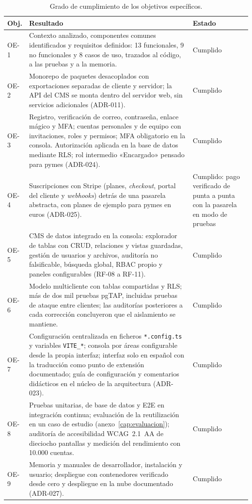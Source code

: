 \begin{table}[htbp]
  \centering
  \footnotesize
  \caption{Grado de cumplimiento de los objetivos específicos.}
  \label{tab:concl-objetivos}
  \begin{tabularx}{\textwidth}{@{}lX>{\raggedright\arraybackslash}p{2cm}@{}}
    \toprule
    \textbf{Obj.} & \textbf{Resultado} & \textbf{Estado} \\
    \midrule
    OE-1 & Contexto analizado, componentes comunes identificados y requisitos definidos: 13 funcionales, 9 no funcionales y 8 casos de uso, trazados al código, a las pruebas y a la memoria. & Cumplido \\
    OE-2 & Monorepo de paquetes desacoplados con exportaciones separadas de cliente y servidor; la API del CMS se monta dentro del servidor web, sin servicios adicionales (ADR-011). & Cumplido \\
    OE-3 & Registro, verificación de correo, contraseña, enlace mágico y MFA; cuentas personales y de equipo con invitaciones, roles y permisos; MFA obligatorio en la consola. Autorización aplicada en la base de datos mediante RLS; rol intermedio «Encargado» pensado para pymes (ADR-024). & Cumplido \\
    OE-4 & Suscripciones con Stripe (planes, \textit{checkout}, portal del cliente y \textit{webhooks}) detrás de una pasarela abstracta, con planes de ejemplo para pymes en euros (ADR-025). & Cumplido: pago verificado de punta a punta con la pasarela en modo de pruebas \\
    OE-5 & CMS de datos integrado en la consola: explorador de tablas con CRUD, relaciones y vistas guardadas, gestión de usuarios y archivos, auditoría no falsificable, búsqueda global, RBAC propio y paneles configurables (RF-08 a RF-11). & Cumplido \\
    OE-6 & Modelo multicliente con tablas compartidas y RLS; más de dos mil pruebas pgTAP, incluidas pruebas de ataque entre clientes; las auditorías posteriores a cada corrección concluyeron que el aislamiento se mantiene. & Cumplido \\
    OE-7 & Configuración centralizada en ficheros \texttt{*.config.ts} y variables \texttt{VITE\_*}; consola por áreas configurable desde la propia interfaz; interfaz solo en español con la traducción como punto de extensión documentado; guía de configuración y comentarios didácticos en el núcleo de la arquitectura (ADR-023). & Cumplido \\
    OE-8 & Pruebas unitarias, de base de datos y E2E en integración continua; evaluación de la reutilización en un caso de estudio (anexo~\ref{cap:evaluacion}); auditoría de accesibilidad WCAG~2.1~AA de dieciocho pantallas y medición del rendimiento con 10.000 cuentas. & Cumplido\\
    OE-9 & Memoria y manuales de desarrollador, instalación y usuario; despliegue con contenedores verificado desde cero y despliegue en la nube documentado (ADR-027). & Cumplido \\
    \bottomrule
  \end{tabularx}
\end{table}

